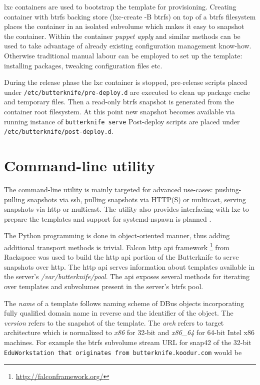 \documentclass[a4paper,11pt]{kth-mag}
\begin{document}
\acrshort{lxc} containers are used to bootstrap the template for provisioning.
Creating container with \acrshort{btrfs} backing store (lxc-create -B btrfs)
on top of a \acrshort{btrfs} filesystem places the container in an
isolated subvolume which makes it easy to snapshot the container.
Within the container \emph{puppet apply} and similar methods can be used
to take advantage of already existing configuration management know-how.
Otherwise traditional manual labour can be employed
to set up the template: installing packages, tweaking configuration files etc.

During the release phase the \acrshort{lxc} container is stopped,
pre-release scripts placed under \lstinline!/etc/butterknife/pre-deploy.d!
are executed to clean up package cache and temporary files.
Then a read-only \acrshort{btrfs} snapshot is generated from the container root filesystem.
At this point new snapshot becomes available via running instance of
\lstinline!butterknife serve!
Post-deploy scripts are placed under \lstinline!/etc/butterknife/post-deploy.d!.


\section{Command-line utility}

The command-line utility is mainly targeted for
advanced use-cases:
pushing-pulling snapshots via \acrfull{ssh},
pulling snapshots via HTTP(S) or multicast,
serving snapshots via \acrshort{http} or multicast.
The utility also provides interfacing with
\acrshort{lxc} to prepare the templates and
support for systemd-nspawn
is planned \cite{systemd-nspawn}.


The Python programming is done in object-oriented manner,
thus adding additional transport methods is trivial.
Falcon \acrshort{http} \acrshort{api} framework
\footnote{\url{http://falconframework.org/}}
from Rackspace was used to build the
\acrshort{http} \acrshort{api} portion of the Butterknife to serve
snapshots over \acrshort{http}.
The \acrshort{http} \acrshort{api} serves information about templates
available in the server's \emph{/var/butterknife/pool}.
The \acrshort{api} exposes several methods for iterating
over templates and subvolumes present in
the server's \acrshort{btrfs} pool.

The \emph{name} of a template follows naming scheme of DBus objects
incorporating fully qualified domain name in reverse and the identifier
of the object.
The \emph{version} refers to the snapshot of the template.
The \emph{arch} refers to target architecture which is normalized
to \emph{x86} for 32-bit and \emph{x86\_64} for 64-bit Intel x86 machines.
For example the \acrshort{btrfs} subvolume stream URL for
snap42 of the 32-bit
\lstinline!EduWorkstation that originates from butterknife.koodur.com! would be
\end{document}

